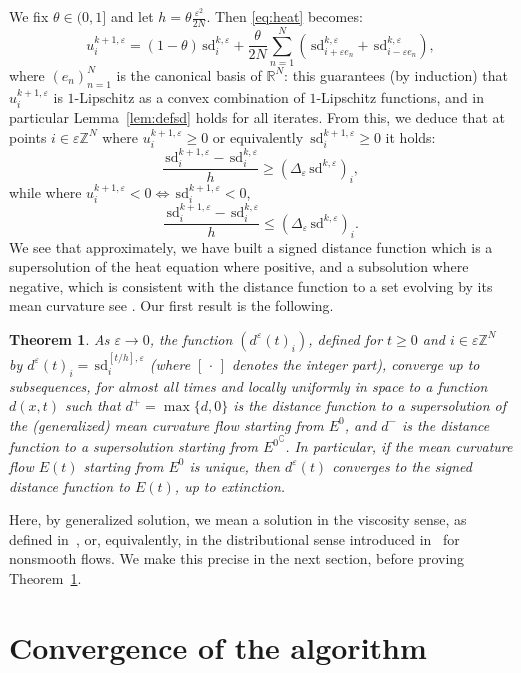 \documentclass[10pt]{amsart}
\theoremstyle{plain}
\newtheorem{theorem}{Theorem}[section]
\theoremstyle{definition}
\newcommand{\R}{\mathbb{R}}
\newcommand{\Z}{\mathbb{Z}}
\newcommand{\comp}[1]{{#1}^\complement}
\newcommand{\e}{\varepsilon}
\newcommand{\sd}{\,\mathrm{sd}}
\newcommand{\ez}{\e\Z^N}
\numberwithin{equation}{section}
\begin{document}
We fix $\theta\in  {(0,1]}$ and let $h = \theta\frac{\e^2}{2N}$.
Then \eqref{eq:heat} becomes:
\[
  u_i^{k+1,\e} = (1-\theta) \sd_i^{k,\e} + \frac{\theta}{2N}\sum_{n=1}^N
  \left(\sd_{i+\e e_n}^{k,\e} + \sd_{i-\e e_n}^{k,\e}\right),
\]
where $(e_n)_{n=1}^N$ is the canonical basis of $\R^N$:
this guarantees  {(by induction)} that $u_i^{k+1,\e}$ is $1$-Lipschitz
as a convex combination of $1$-Lipschitz functions, and in particular Lemma~\ref{lem:defsd}
holds for all iterates. From this, we deduce that 
at points $i\in\ez$ where $u^{k+1,\e}_i\ge 0$ or equivalently $\sd^{k+1,\e}_i\ge 0$ it holds:  
\begin{equation}\label{eq:subsoldiscrete}
  \frac{\sd_i^{k+1,\e}-\sd_i^{k,\e}}{h} \ge (\Delta_\e \sd^{k,\e})_i,
\end{equation}
while where $u^{k+1,\e}_i<0 \Leftrightarrow \sd^{k+1,\e}_i< 0$,
\begin{equation}\label{eq:supersoldiscrete}
  \frac{\sd_i^{k+1,\e}-\sd_i^{k,\e}}{h} \le (\Delta_\e \sd^{k,\e})_i.
\end{equation}
We see that approximately, we have built a signed distance function
which is a supersolution of the heat equation where positive,
and a subsolution where negative, which is consistent with the
distance function to a set evolving by its mean curvature  {see \cite{Soner93}}.
Our first result is the following.
\begin{theorem}\label{th:mainexplicit}
  As $\e\to 0$, the function $(d^\e(t)_i)$, defined for $t\ge 0$ and $i\in\e\Z^N$
  by $d^\e(t)_i = \sd^{[t/h],\e}_i$ (where $[\,\cdot\,]$ denotes the
  integer part), converge up to subsequences,
  for almost all times and locally uniformly in space to a function
  $d(x,t)$ such that $d^+=\max\{d,0\}$ is the distance function
  to a supersolution of the (generalized)
  mean curvature flow starting from $E^0$,
  and $d^-$ is the distance function to a supersolution starting from
  $\comp{E^0}$. In particular, if the mean curvature flow $E(t)$ starting
  from $E^0$ is unique, then $d^\e(t)$ converges to the signed distance
  function to $E(t)$, up to extinction.
\end{theorem}
Here, by generalized solution, we mean a solution in the viscosity
sense, as defined in~\cite{EvaSpr,BarSou,BarSonSou,Soner93}, or, equivalently,
in the distributional sense introduced in~\cite{CMP17} for nonsmooth
flows. We make this precise in the next section, before
proving Theorem~\ref{th:mainexplicit}.
\section{Convergence of the algorithm}\label{sec:conv_expl}
\end{document}
